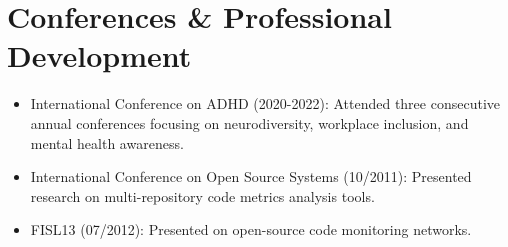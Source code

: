 \section{Conferences \& Professional Development}
\begin{itemize}
    \item \footnotesize{International Conference on ADHD (2020-2022):}\scriptsize{ Attended three consecutive annual conferences focusing on neurodiversity, workplace inclusion, and mental health awareness.}
    \item \footnotesize{International Conference on Open Source Systems (10/2011):}\scriptsize{ Presented research on multi-repository code metrics analysis tools.}
    \item \footnotesize{FISL13 (07/2012):}\scriptsize{ Presented on open-source code monitoring networks.}
\end{itemize}